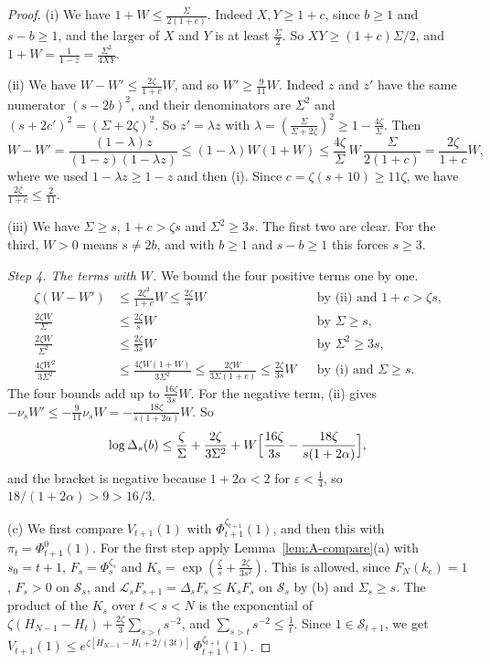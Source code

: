 \begin{proof}
(i) We have $1+W\le\frac\Sigma{2(1+c)}$. Indeed $X,Y\ge1+c$, since $b\ge1$ and
$s-b\ge1$, and the larger of $X$ and $Y$ is at least $\frac\Sigma2$. So
$XY\ge(1+c)\Sigma/2$, and $1+W=\frac1{1-z}=\frac{\Sigma^2}{4XY}$.

(ii) We have $W-W'\le\frac{2\zeta}{1+c}W$, and so $W'\ge\frac9{11}W$. Indeed $z$
and $z'$ have the same numerator $(s-2b)^2$, and their denominators are
$\Sigma^2$ and $(s+2c')^2=(\Sigma+2\zeta)^2$. So $z'=\lambda z$ with
$\lambda=(\frac\Sigma{\Sigma+2\zeta})^2\ge1-\frac{4\zeta}\Sigma$. Then
\[
 W-W'=\frac{(1-\lambda)z}{(1-z)(1-\lambda z)}\le(1-\lambda)W(1+W)
 \le\frac{4\zeta}\Sigma\,W\,\frac\Sigma{2(1+c)}=\frac{2\zeta}{1+c}W,
\]
where we used $1-\lambda z\ge1-z$ and then (i). Since
$c=\zeta(s+10)\ge11\zeta$, we have $\frac{2\zeta}{1+c}\le\frac2{11}$.

(iii) We have $\Sigma\ge s$, $1+c>\zeta s$ and $\Sigma^2\ge3s$. The first two are
clear. For the third, $W>0$ means $s\ne2b$, and with $b\ge1$ and $s-b\ge1$
this forces $s\ge3$.

\emph{Step 4. The terms with $W$.} We bound the four positive terms one by
one.
\begin{align*}
 \zeta(W-W')&\le\frac{2\zeta^2}{1+c}W\le\frac{2\zeta}sW
 &&\text{by (ii) and $1+c>\zeta s$,}\\
 \frac{2\zeta W}\Sigma&\le\frac{2\zeta}sW
 &&\text{by $\Sigma\ge s$,}\\
 \frac{2\zeta W}{\Sigma^2}&\le\frac{2\zeta}{3s}W
 &&\text{by $\Sigma^2\ge3s$,}\\
 \frac{4\zeta W^2}{3\Sigma^2}&\le\frac{4\zeta W(1+W)}{3\Sigma^2}
 \le\frac{2\zeta W}{3\Sigma(1+c)}\le\frac{2\zeta}{3s}W
 &&\text{by (i) and $\Sigma\ge s$.}
\end{align*}
The four bounds add up to $\frac{16\zeta}{3s}W$. For the negative term, (ii)
gives $-\nu_sW'\le-\frac9{11}\nu_sW=-\frac{18\zeta}{s(1+2\alpha)}W$. So
\[
 \log \Delta_s(b)\le\frac\zeta\Sigma+\frac{2\zeta}{3\Sigma^2}
 +W\Bigl[\frac{16\zeta}{3s}-\frac{18\zeta}{s(1+2\alpha)}\Bigr],
\]
and the bracket is negative because $1+2\alpha<2$ for $\varepsilon<\frac14$,
so $18/(1+2\alpha)>9>16/3$.

(c) We first compare $V_{t+1}(1)$ with $\Phi^{\zeta_{t+1}}_{t+1}(1)$, and
then this with $\pi_t=\Phi^0_{t+1}(1)$. For the first step apply
Lemma~\ref{lem:A-compare}(a) with $s_0=t+1$,
$F_s=\Phi^{\zeta_s}_s$ and $K_s=\exp(\frac\zeta s+\frac{2\zeta}{3s^2})$.
This is allowed, since $F_N({k_{\mathrm c}})=1$, $F_s>0$ on $\mathcal S_s$, and
$\mathcal L_sF_{s+1}=\Delta_sF_s\le K_sF_s$ on $\mathcal S_s$ by (b) and
$\Sigma_s\ge s$. The product of the $K_s$ over $t<s<N$ is the exponential of
$\zeta(H_{N-1}-H_t)+\frac{2\zeta}3\sum_{s>t}s^{-2}$, and
$\sum_{s>t}s^{-2}\le\frac1t$. Since $1\in\mathcal S_{t+1}$, we get
$V_{t+1}(1)\le e^{\zeta[H_{N-1}-H_t+2/(3t)]}\,\Phi^{\zeta_{t+1}}_{t+1}(1)$.


\end{proof}
